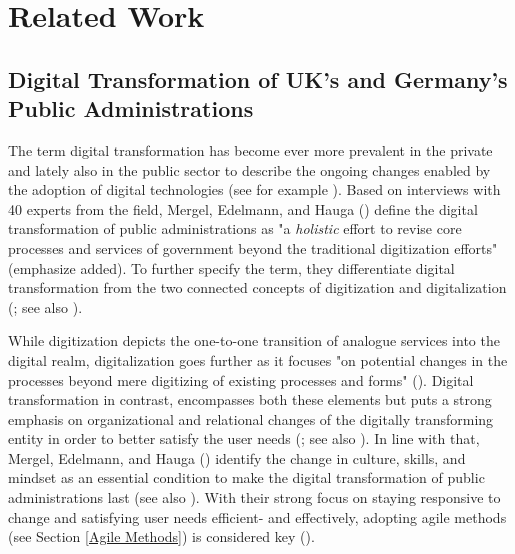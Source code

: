 \section{Related Work}
\subsection{Digital Transformation of UK's and Germany's Public Administrations}
The term digital transformation has become ever more prevalent in the private and lately also in the public sector to describe the ongoing changes enabled by the adoption of digital technologies (see for example \cite{McKinsey2018,BehordenSpiegel2020,Tabrizi2019}). Based on interviews with 40 experts from the field, Mergel, Edelmann, and Hauga (\cite*[p. 12]{Mergel2019a}) define the digital transformation of public administrations as "a \textit{holistic} effort to revise core processes and services of government beyond the traditional digitization efforts" (emphasize added). To further specify the term, they differentiate digital transformation from the two connected concepts of digitization and digitalization (\cite{Mergel2019a}; see also \cite{Bloomberg2018, Brennen2015}).\par 
While digitization depicts the one-to-one transition of analogue services into the digital realm, digitalization goes further as it focuses "on potential changes in the processes beyond mere digitizing of existing processes and forms" (\cite[p. 12]{Mergel2019a}). Digital transformation in contrast, encompasses both these elements but puts a strong emphasis on organizational and relational changes of the digitally transforming entity in order to better satisfy the user needs (\cite{Mergel2019a}; see also \cite{Vial2019, Henriette2015}). In line with that, Mergel, Edelmann, and Hauga (\cite*{Mergel2019a}) identify the change in culture, skills, and mindset as an essential condition to make the digital transformation of public administrations last (see also \cite{Dierks2020, Parcell2013}). With their strong focus on staying responsive to change and satisfying user needs efficient- and effectively, adopting agile methods (see Section \ref{Agile Methods}) is considered key (\cite{Mergel2018a,Beyer2010, Mergel2019, osmundsen2020, Andriole2018}).\par 
